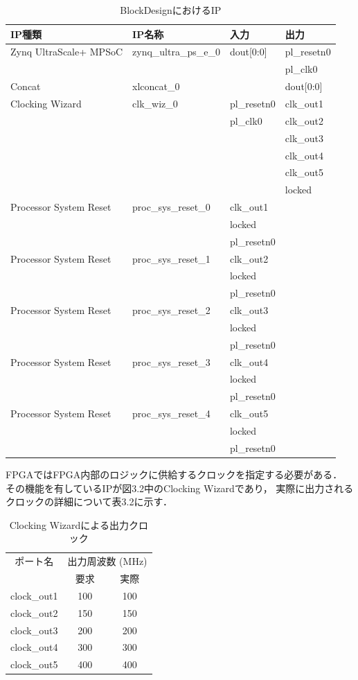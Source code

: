 \documentclass[11pt,a4j]{jreport}
\begin{document}
\begin{table}[H]
  \caption{BlockDesignにおけるIP}
  \label{table:SpeedOfLight}
  \centering
   \begin{tabular}{llll}
    \hline
    IP種類 & IP名称 & 入力 & 出力 \\
    \hline \hline
    Zynq UltraScale+ MPSoC & zynq_ultra_ps_e_0 & dout[0:0] & pl_resetn0 \\
    & & & pl_clk0 \\
    \hline
    Concat & xlconcat_0 & & dout[0:0] \\
    \hline
    Clocking Wizard & clk_wiz_0 & pl_resetn0 & clk_out1 \\
    & & pl_clk0 & clk_out2 \\
    & & & clk_out3 \\
    & & & clk_out4 \\
    & & & clk_out5 \\
    & & & locked \\
    \hline
    Processor System Reset & proc_sys_reset_0 & clk_out1 & \\
    & & locked & \\
    & & pl_resetn0 & \\
    \hline
    Processor System Reset & proc_sys_reset_1 & clk_out2 & \\
    & & locked & \\
    & & pl_resetn0 & \\
    \hline
    Processor System Reset & proc_sys_reset_2 & clk_out3 & \\
    & & locked & \\
    & & pl_resetn0 & \\
    \hline
    Processor System Reset & proc_sys_reset_3 & clk_out4 & \\
    & & locked & \\
    & & pl_resetn0 & \\
    \hline
    Processor System Reset & proc_sys_reset_4 & clk_out5 & \\
    & & locked & \\
    & & pl_resetn0 & \\
  \hline
  \end{tabular}
\end{table}
FPGAではFPGA内部のロジックに供給するクロックを指定する必要がある．
その機能を有しているIPが図3.2中のClocking Wizardであり，
実際に出力されるクロックの詳細について表3.2に示す．
\begin{table}[H]
  \caption{Clocking Wizardによる出力クロック}
  \label{physics}
  \centering
  \begin{tabular}{ccc}
    \hline
    ポート名 & \multicolumn{2}{c}{出力周波数 (MHz)} \\
    \cmidrule(lr){2-3}
     & 要求 & 実際 \\
    \hline
    clock_out1 & 100 & 100 \\
    clock_out2 & 150 & 150 \\
    clock_out3 & 200 & 200 \\
    clock_out4 & 300 & 300 \\
    clock_out5 & 400 & 400 \\
    \hline
    \end{tabular}
\end{table}
\end{document}
